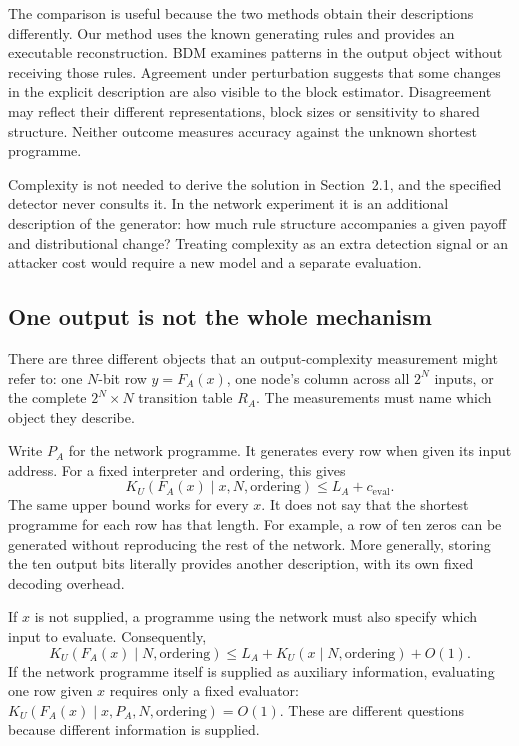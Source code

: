 \documentclass[11pt,a4paper]{article}
\begin{document}
The comparison is useful because the two methods obtain their descriptions
differently. Our method uses the known generating rules and provides an
executable reconstruction. BDM examines patterns in the output object
without receiving those rules. Agreement under perturbation suggests
that some changes in the explicit description are also visible to the
block estimator. Disagreement may reflect their different representations,
block sizes or sensitivity to shared structure. Neither outcome measures
accuracy against the unknown shortest programme.

Complexity is not needed to derive the solution in Section~2.1, and the
specified detector never consults it. In the network experiment it is an
additional description of the generator: how much rule structure
accompanies a given payoff and distributional change? Treating complexity
as an extra detection signal or an attacker cost would require a new
model and a separate evaluation.

\subsection{One output is not the whole mechanism}\label{sec:row-complexity}
There are three different objects that an output-complexity measurement
might refer to: one $N$-bit row $y=F_A(x)$, one node's column across all
$2^N$ inputs, or the complete $2^N\times N$ transition table $R_A$.
The measurements must name which object they describe.

Write $P_A$ for the network programme. It generates every row when given its input address.
For a fixed interpreter and ordering, this gives
\[
 K_U(F_A(x)\mid x,N,\text{ordering})\leq L_A+c_{\mathrm{eval}}.
\]
The same upper bound works for every $x$. It does not say that the shortest
programme for each row has that length. For example, a row of ten zeros
can be generated without reproducing the rest of the network. More
generally, storing the ten output bits literally provides another
description, with its own fixed decoding overhead.

If $x$ is not supplied, a programme using the network must also specify
which input to evaluate. Consequently,
\[
 K_U(F_A(x)\mid N,\text{ordering})
 \leq L_A+K_U(x\mid N,\text{ordering})+O(1).
\]
If the network programme itself is supplied as auxiliary information,
evaluating one row given $x$ requires only a fixed evaluator:
$K_U(F_A(x)\mid x,P_A,N,\text{ordering})=O(1)$.
These are different questions because different information is supplied.
\end{document}
